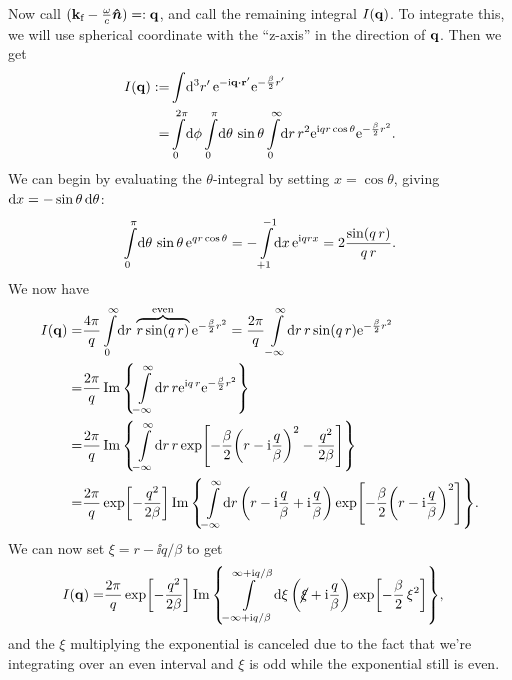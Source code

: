 \documentclass[11pt,letter, swedish, english
]{article}
\begin{document}
Now call $(\vb{k}_{\text{f}}-\frac{\omega}{c}\vu*{n})=:\vb{q}$, and call the remaining
integral $I(\vb{q})$.
To integrate this, we will use spherical coordinate with the
``z-axis'' in the direction of $\vb{q}$. Then we get
\begin{equation}
\begin{aligned}
I(\vq):=&\int\!\rd^3r'\,
\ee^{-\ii\vq\vdot\vb{r}'}
\ee^{-\frac{\beta}{2}r'}\\
=&\int_0^{2\pi}\!\rd\phi\int_0^\pi\!\rd\theta\,\sin\theta
\int_0^\infty\!\rd{r}\,r^2\ee^{\ii q r\cos\theta}\ee^{-\frac{\beta}{2}r^2}.
\end{aligned}
\end{equation}
We can begin by evaluating the $\theta$-integral by setting
$x=\cos\theta$, giving $\mathrm{d}{x}=-\sin\theta\,\mathrm{d}\theta$:
\begin{equation}\label{eq:2_theta_int}
\int_0^\pi\!\rd\theta\,\sin\theta\,\ee^{q r\cos\theta}
=-\int_{+1}^{-1}\!\rd{x}\,\ee^{\ii q rx}
=2\frac{\sin(q\,r)}{q\,r}.
\end{equation}
We now have
\begin{equation}
\begin{aligned}
I(\vq)=&\frac{4\pi}{q} \int_0^\infty\!\rd{r}\,
\overbrace{r\sin(q\,r)}^{\text{even}}
\ee^{-\frac{\beta}{2}r^2}=\frac{2\pi}{q} \int_{-\infty}^\infty\!\rd{r}\,
r\sin(q\,r)\ee^{-\frac{\beta}{2}r^2}\\
=&\frac{2\pi}{q} \Im\qty{
\int_{-\infty}^\infty\!\rd{r}\,
r\ee^{\ii q\,r}\ee^{-\frac{\beta}{2}r^2}}\\
=&\frac{2\pi}{q} \Im\qty{
\int_{-\infty}^\infty\!\rd{r}\,
r\exp[-\frac{\beta}{2}\qty(r-\ii\frac{q}{\beta})^2
-\frac{q^2}{2\beta}] }\\
=&\frac{2\pi}{q}\exp[-\frac{q^2}{2\beta}]
\Im\qty{\int_{-\infty}^\infty\!\rd{r}\,
\qty(r-\ii\frac{q}{\beta}+\ii\frac{q}{\beta})
\exp[-\frac{\beta}{2}\qty(r-\ii\frac{q}{\beta})^2]}.
\end{aligned}
\end{equation}
We can now set $\xi=r-\ii q/\beta$ to get
\begin{equation}\label{eq:2_comlex_integral}
\begin{aligned}
I(\vq)=&\frac{2\pi}{q}\exp[-\frac{q^2}{2\beta}]
\Im\qty{\int_{-\infty+\ii q/\beta}^{\infty+\ii q/\beta}\!\rd{\xi}\,
\qty(\cancel{\xi}+\ii\frac{q}{\beta})
\exp[-\frac{\beta}{2}\,\xi^2]},
\end{aligned}
\end{equation}
and the $\xi$ multiplying the exponential is canceled due to the fact
that we're integrating over an even interval and $\xi$ is odd while
the exponential still is even. 
\end{document}
